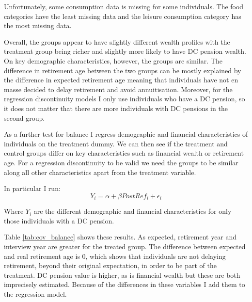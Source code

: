 \documentclass[12pt]{article}
\begin{document}
Unfortunately, some consumption data is missing for some individuals. The food
categories have the least missing data and the leisure consumption category has
the most missing data.

Overall, the groups appear to have slightly different wealth profiles with the
treatment group being richer and slightly more likely to have DC pension wealth.
On key demographic characteristics, however, the groups are similar. The
difference in retirement age between the two groups can be mostly explained by
the difference in expected retirement age meaning that individuals have not en
masse decided to delay retirement and avoid annuitisation. Moreover, for the
regression discontinuity models I only use individuals who have a DC pension, so
it does not matter that there are more individuals with DC pensions in the
second group.

\begin{landscape}
    \linespread{1.25}
    
    \normalsize
\end{landscape}


As a further test for balance I regress demographic and financial
characteristics of individuals on the treatment dummy. We can then see if the
treatment and control groups differ on key characteristics such as financial
wealth or retirement age. For a regression discontinuity to be valid we need the
groups to be similar along all other characteristics apart from the treatment
variable.

In particular I run:
\begin{equation*}
    Y_{i} = \alpha + \beta PostRef_{i}  + \epsilon_{i}
\end{equation*}

Where $Y_{i}$ are the different demographic and financial characteristics for
only those individuals with a DC pension.

\linespread{1}

\linespread{1.5}

Table \ref{tab:cov_balance} shows these results. As expected, retirement year
and interview year are greater for the treated group. The difference between
expected and real retirement age is 0, which shows that individuals are not
delaying retirement, beyond their original expectation, in order to be part of
the treatment. DC pension value is higher, as is financial wealth but these are
both imprecisely estimated. Because of the differences in these variables I add
them to the regression model.
\end{document}
